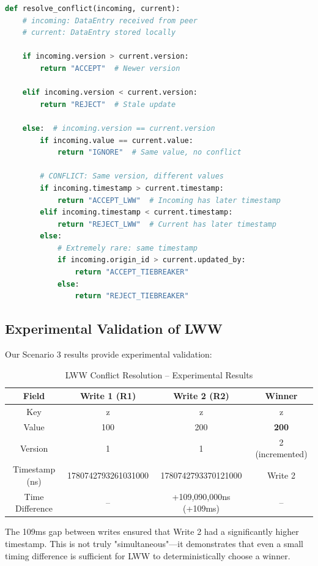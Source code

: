 \documentclass[10pt,a4paper]{article}
\begin{document}
\begin{lstlisting}[language=Python, caption=LWW Conflict Resolution Algorithm]
def resolve_conflict(incoming, current):
    # incoming: DataEntry received from peer
    # current: DataEntry stored locally
    
    if incoming.version > current.version:
        return "ACCEPT"  # Newer version
    
    elif incoming.version < current.version:
        return "REJECT"  # Stale update
    
    else:  # incoming.version == current.version
        if incoming.value == current.value:
            return "IGNORE"  # Same value, no conflict
        
        # CONFLICT: Same version, different values
        if incoming.timestamp > current.timestamp:
            return "ACCEPT_LWW"  # Incoming has later timestamp
        elif incoming.timestamp < current.timestamp:
            return "REJECT_LWW"  # Current has later timestamp
        else:
            # Extremely rare: same timestamp
            if incoming.origin_id > current.updated_by:
                return "ACCEPT_TIEBREAKER"
            else:
                return "REJECT_TIEBREAKER"
\end{lstlisting}

\subsection{Experimental Validation of LWW}

Our Scenario 3 results provide experimental validation:

\begin{table}[H]
\centering
\caption{LWW Conflict Resolution -- Experimental Results}
\begin{tabular}{|c|c|c|c|}
\hline
\textbf{Field} & \textbf{Write 1 (R1)} & \textbf{Write 2 (R2)} & \textbf{Winner} \\
\hline
Key & z & z & z \\
Value & 100 & 200 & \textbf{200} \\
Version & 1 & 1 & 2 (incremented) \\
Timestamp (ns) & 1780742793261031000 & 1780742793370121000 & Write 2 \\
Time Difference & -- & +109,090,000ns (+109ms) & -- \\
\hline
\end{tabular}
\end{table}

The 109ms gap between writes ensured that Write 2 had a significantly higher timestamp. This is not truly "simultaneous"---it demonstrates that even a small timing difference is sufficient for LWW to deterministically choose a winner.
\end{document}
